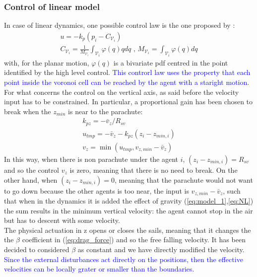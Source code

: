 \subsubsection{Control of linear model}
In case of linear dynamics, one possible control law is the one proposed by \cite{b1}:
\begin{gather}
    \label{eq:proportional}
    u=-k_p\left(p_i - C_{\mathcal{V}_i}\right)\\
    \label{centroid}
    C_{\mathcal{V}_i} = \frac{1}{M_{\mathcal{V}_i}}\int_{\mathcal{V}_i}\varphi\left(q\right)qdq \text{ , } M_{\mathcal{V}_i} = \int_{\mathcal{V}_i}\varphi\left(q\right)dq
\end{gather}
with, for the planar motion, $\varphi\left(q\right)$ is a bivariate pdf centred in the point identified by the high level control. \textcolor{blue}{This controrl law uses the property that each point inside the voronoi cell can be reached by the agent with a staright motion}.\\
For what concerns the control on the vertical axis, as said before the velocity input has to be constrained. In particular, a proportional gain has been chosen to break when the $z_{min}$ is near to the parachute:
\begin{equation}
\label{control_law_z}
    \begin{gathered}
        k_{pz}=-\bar{v}_z/R_{sv}\\
        u_{tmp}=-\bar{v}_z-k_{pz}(z_i-z_{min,i})\\
        v_z=\min(u_{tmp}, v_{z,min}-\bar{v}_z)
    \end{gathered}
\end{equation}
In this way, when there is non parachute under the agent $i$, $(z_i-z_{min,i})=R_{sv}$ and so the control $v_z$ is zero, meaning that there is no need to break. On the other hand, when $(z_i-z_{min,i})=0$, meaning that the parachute would not want to go down because the other agents is too near, the input is $v_{z,min}-\bar{v}_z$, such that when in the dynamics it is added the effect of gravity (\ref{eq:model_1},\ref{eq:NL}) the sum results in the minimum vertical velocity: the agent cannot stop in the air but has to descent with some velocity.\\
The physical actuation in z opens or closes the sails, meaning that it changes the the $\beta$ coefficient in (\ref{eq:drag_force}) and so the free falling velocity. It has been decided to considered $\beta$ as constant and we have directly modified the velocity.\\
\textcolor{blue}{Since the external disturbances act directly on the positions, then the effective velocities can be locally grater or smaller than the boundaries.}
